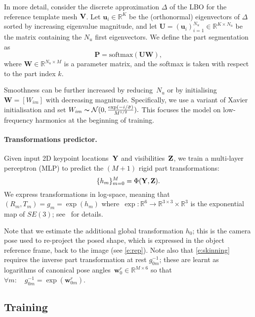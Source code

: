 In more detail, consider the discrete approximation $\Delta$ of the LBO for the reference template mesh $\mathbf{V}$.
Let $\mathbf{u}_i \in \mathbb{R}^{K}$ be the (orthonormal) eigenvectors of $\Delta$ sorted by increasing eigenvalue magnitude, and let $\mathbf{U} = (\mathbf{u}_i)_{i=1}^{N_u}\in\mathbb{R}^{K\times N_u}$ be the matrix containing the $N_u$ first eigenvectors.
We define the part segmentation as
\begin{equation}\label{e:parts}
\mathbf{P} = \textrm{softmax}(\mathbf{U} \mathbf{W}),
\end{equation}
where $\mathbf{W} \in \mathbb{R}^{N_u \times M}$ is a parameter matrix, and the softmax is taken with respect to the part index $k$.

Smoothness can be further increased by reducing~$N_u$ or by initialising~$\mathbf{W} = [W_{im}]$ with decreasing magnitude.
Specifically, we use a variant of Xavier initialisation and set
$
W_{im} \thicksim \mathcal{N}(0, \frac{\exp(- i / \bar{\sigma})}{M^{1/2}}).
$
This focuses the model on low-frequency harmonics at the beginning of training.



\paragraph{Transformations predictor.}

Given input 2D keypoint locations~$\mathbf{Y}$ and visibilities~$\mathbf{Z}$, we train a multi-layer perceptron (MLP) to predict the $(M+1)$ rigid part transformations:
\begin{equation}\label{e:transforms}
  \{h_m\}_{m=0}^M = \Phi(\mathbf{Y}, \mathbf{Z}).
\end{equation}
We express transformations in log-space, meaning that
$
(R_m, T_m) = g_m = \exp(h_m)
$
where~$\exp: \mathbb{R}^6 \to \mathbb{R}^{3 \times 3} \times \mathbb{R}^3$ is the exponential map of $SE(3)$; see~\cite{Blanco2010} for details.

Note that we estimate the additional global transformation $h_0$; this is the camera pose used to re-project the posed shape, which is expressed in the object reference frame, back to the image (see \cref{e:rep}).
Note also that \cref{e:skinning} requires the inverse part transformation at rest $g_{0m}^{-1}$; these are learnt as logarithms of canonical pose angles~$\mathbf{w}^r_0 \in \mathbb{R}^{M \times 6}$ so that~%
$
\forall m: \quad g_{0m}^{-1} = \exp(\mathbf{w}^r_{0m})
$.

\subsection{Training}


